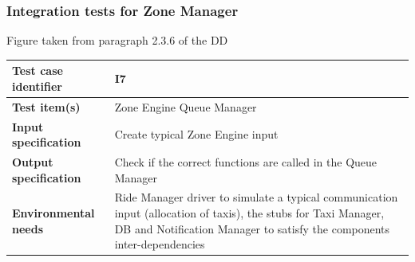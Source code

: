 \documentclass[a4paper,11pt]{report} %
\begin{document}
		\subsubsection{Integration tests for Zone Manager} \label{sec:3.1.4}
		\begin{minipage}{\linewidth}
		\end{minipage}
		\begin{center}
			Figure taken from paragraph 2.3.6 of the DD
		\end{center} 
		\begin{center}
			\renewcommand{\arraystretch}{1.2}
			\setlength{\tabcolsep}{24pt}
			\begin{tabular}{ l  p{9cm}}\hline
				\textbf{Test case identifier} & I7\\\hline
				\textbf{Test item(s)} & Zone Engine \textrightarrow Queue Manager\\\hline
				\textbf{Input specification} & Create typical Zone Engine input \\\hline
				\textbf{Output specification} & Check if the correct functions are called in the Queue Manager\\\hline
				\textbf{Environmental needs} & Ride Manager driver to simulate a typical communication input (allocation of taxis), the stubs for Taxi Manager, DB and Notification Manager to satisfy the components inter-dependencies\\\hline
			\end{tabular}
		\end{center}	
		
		\smallskip
\end{document}
